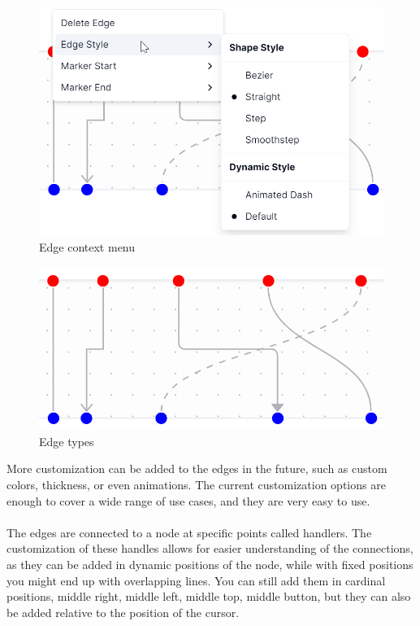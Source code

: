 \begin{figure}[hbt!]
    \centering
    \includegraphics[scale=0.75]{images/edges-context-menu.png}
    \caption{Edge context menu}
    \label{fig:edges-context-menu}
\end{figure}

\begin{figure}[hbt!]
    \centering
    \includegraphics[scale=0.75]{images/edges.png}
    \caption{Edge types}
    \label{fig:edges}
\end{figure}

\noindent More customization can be added to the edges in the future, such as custom colors, thickness, or even animations. The current customization options are enough to cover a wide range of use cases, and they are very easy to use.
\\\\
\noindent The edges are connected to a node at specific points called handlers. The customization of these handles allows for easier understanding of the connections, as they can be added in dynamic positions of the node, while with fixed positions you might end up with overlapping lines. You can still add them in cardinal positions, middle right, middle left, middle top, middle button, but they can also be added relative to the position of the cursor.

